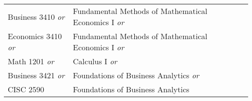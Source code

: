 \documentclass{article}
\begin{document}
\begin{Form}
\begin{longtable}{ |p{3.27cm}|p{6cm}|p{4.8cm}|p{2.3cm}|  }
		Business 3410 \emph{or}  & Fundamental Methods of Mathematical Economics I \emph{or}  & \TextField[name=b3410_instructor,width=4.8cm,charsize=8pt,bordercolor=1 1 1,borderstyle=U]{}  & \TextField[name=b3410_grade,width=2.2cm,charsize=8pt,bordercolor=1 1 1]{{}}  \\

		Economics 3410 \emph{or} & Fundamental Methods of Mathematical Economics I \emph{or}  & \TextField[name=e3410_instructor,width=4.8cm,charsize=8pt,bordercolor=1 1 1,borderstyle=U]{}  & \TextField[name=e3410_grade,width=2.2cm,charsize=8pt,bordercolor=1 1 1]{{}}  \\

		Math 1201 \emph{or}      & Calculus I \emph{or}                                       & \TextField[name=1201_instructor,width=4.8cm,charsize=8pt,bordercolor=1 1 1,borderstyle=U]{}  & \TextField[name=1201_grade,width=2.2cm,charsize=8pt,bordercolor=1 1 1]{{}}  \\

		Business 3421 \emph{or}  & Foundations of Business Analytics \emph{or}                & \TextField[name=3421_instructor,width=4.8cm,charsize=8pt,bordercolor=1 1 1,borderstyle=U]{}  & \TextField[name=3421_grade,width=2.2cm,charsize=8pt,bordercolor=1 1 1]{{}}  \\

		CISC 2590                & Foundations of Business Analytics                          & \TextField[name=2590_instructor,width=4.8cm,charsize=8pt,bordercolor=1 1 1,borderstyle=U]{}  & \TextField[name=2590_grade,width=2.2cm,charsize=8pt,bordercolor=1 1 1]{{}}  \\
		\hline
	\end{longtable}
	\otherCourses %
	\vfill


\end{Form}
\end{document}
